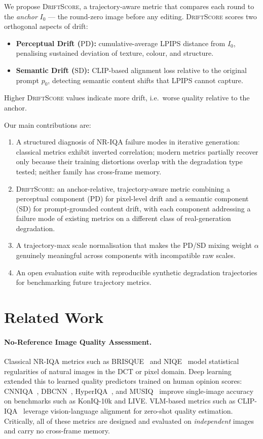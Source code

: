\documentclass[sigconf]{acmart}
\newcommand{\DS}{\textsc{DriftScore}}
\newcommand{\PD}{\ensuremath{\mathrm{PD}}}
\newcommand{\SD}{\ensuremath{\mathrm{SD}}}
\newcommand{\Izero}{\ensuremath{I_0}}
\newcommand{\pzero}{\ensuremath{p_0}}
\begin{document}
We propose \DS{}, a trajectory-aware metric that compares each round to
the \emph{anchor} $\Izero$ --- the round-zero image before any editing.
\DS{} scores two orthogonal aspects of drift:
\begin{itemize}
  \item \textbf{Perceptual Drift (\PD):} cumulative-average LPIPS
    distance from $\Izero$, penalising sustained deviation of
    texture, colour, and structure.
  \item \textbf{Semantic Drift (\SD):} CLIP-based alignment loss
    relative to the original prompt $\pzero$, detecting semantic
    content shifts that LPIPS cannot capture.
\end{itemize}
Higher \DS{} values indicate more drift, i.e.\ worse quality relative
to the anchor.

Our main contributions are:
\begin{enumerate}
  \item A structured diagnosis of NR-IQA failure modes in iterative
    generation: classical metrics exhibit inverted correlation; modern
    metrics partially recover only because their training distortions
    overlap with the degradation type tested; neither family has
    cross-frame memory.
  \item \DS{}: an anchor-relative, trajectory-aware metric combining
    a perceptual component (PD) for pixel-level drift and a semantic
    component (SD) for prompt-grounded content drift, with each component
    addressing a failure mode of existing metrics on a different class
    of real-generation degradation.
  \item A trajectory-max scale normalisation that makes the PD/SD
    mixing weight $\alpha$ genuinely meaningful across components with
    incompatible raw scales.
  \item An open evaluation suite with reproducible synthetic degradation
    trajectories for benchmarking future trajectory metrics.
\end{enumerate}

\section{Related Work}
\label{sec:related}

\paragraph{No-Reference Image Quality Assessment.}
Classical NR-IQA metrics such as BRISQUE~\cite{mittal2012brisque} and
NIQE~\cite{mittal2013niqe} model statistical regularities of natural
images in the DCT or pixel domain.
Deep learning extended this to learned quality predictors trained on
human opinion scores: CNNIQA~\cite{kang2014cnniqa},
DBCNN~\cite{zhang2018dbcnn}, HyperIQA~\cite{su2020hyperiqa}, and
MUSIQ~\cite{ke2021musiq} improve single-image accuracy on benchmarks
such as KonIQ-10k and LIVE.
VLM-based metrics such as CLIP-IQA~\cite{wang2023clipiqa}
leverage vision-language alignment for zero-shot quality estimation.
Critically, all of these metrics are designed and evaluated on
\emph{independent} images and carry no cross-frame memory.
\end{document}
